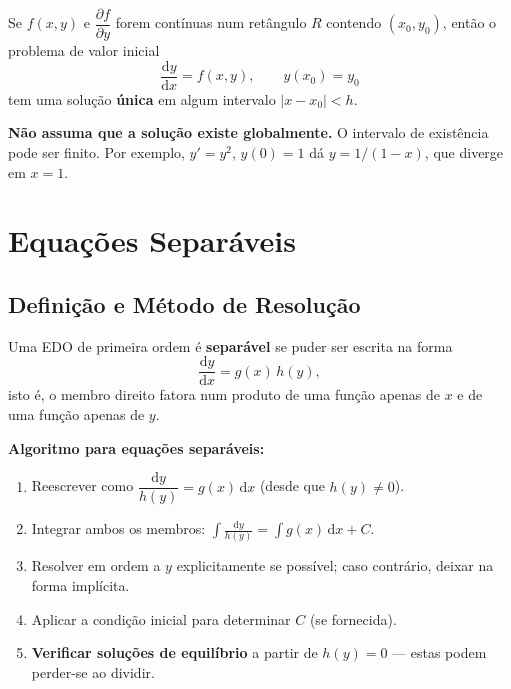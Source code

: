 \documentclass[12pt, a4paper]{article}
\newcommand{\dd}{\mathrm{d}}
\begin{document}
\begin{thmbox}[title={Existência e Unicidade (Picard--Lindel\"{o}f)}]
  Se $f(x,y)$ e $\dfrac{\partial f}{\partial y}$ forem contínuas num retângulo $R$
  contendo $(x_0, y_0)$, então o problema de valor inicial
  \[
    \frac{\dd y}{\dd x} = f(x,y), \qquad y(x_0)=y_0
  \]
  tem uma solução \textbf{única} em algum intervalo $|x - x_0| < h$.
\end{thmbox}

\begin{warnbox}
  \textbf{Não assuma que a solução existe globalmente.} O intervalo de existência pode ser
  finito. Por exemplo, $y' = y^2$, $y(0)=1$ dá $y = 1/(1-x)$, que diverge em $x=1$.
\end{warnbox}

\section{Equações Separáveis}
\label{sec:separable}

\subsection{Definição e Método de Resolução}

\begin{defbox}
  Uma EDO de primeira ordem é \textbf{separável} se puder ser escrita na forma
  \[
    \frac{\dd y}{\dd x} = g(x)\,h(y),
  \]
  isto é, o membro direito fatora num produto de uma função apenas de $x$ e de uma
  função apenas de $y$.
\end{defbox}

\noindent\textbf{Algoritmo para equações separáveis:}

\begin{enumerate}
  \item Reescrever como $\dfrac{\dd y}{h(y)} = g(x)\,\dd x$ \quad (desde que $h(y)\neq 0$).
  \item Integrar ambos os membros:
        $\displaystyle\int \frac{\dd y}{h(y)} = \int g(x)\,\dd x + C$.
  \item Resolver em ordem a $y$ explicitamente se possível; caso contrário, deixar na forma implícita.
  \item Aplicar a condição inicial para determinar $C$ (se fornecida).
  \item \textbf{Verificar soluções de equilíbrio} a partir de $h(y)=0$ --- estas podem
        perder-se ao dividir.
\end{enumerate}
\end{document}
